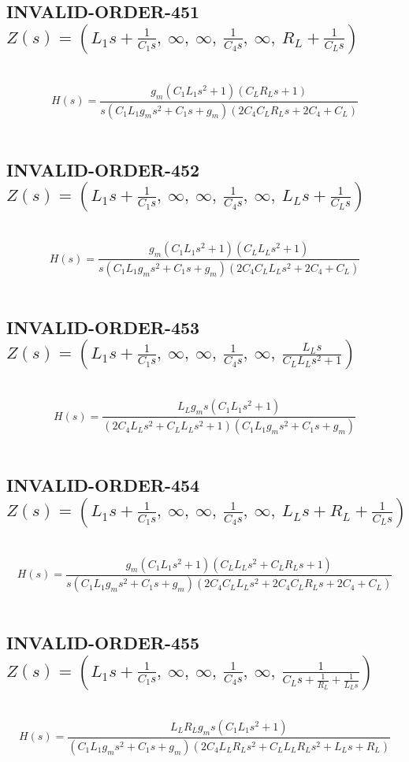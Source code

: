 \documentclass{article}
\begin{document}
\subsection{INVALID-ORDER-451 $Z(s) = \left( L_{1} s + \frac{1}{C_{1} s}, \  \infty, \  \infty, \  \frac{1}{C_{4} s}, \  \infty, \  R_{L} + \frac{1}{C_{L} s}\right)$ } \ 
\textbf{\[H(s) = \frac{g_{m} \left(C_{1} L_{1} s^{2} + 1\right) \left(C_{L} R_{L} s + 1\right)}{s \left(C_{1} L_{1} g_{m} s^{2} + C_{1} s + g_{m}\right) \left(2 C_{4} C_{L} R_{L} s + 2 C_{4} + C_{L}\right)}\] } \ 
\subsection{INVALID-ORDER-452 $Z(s) = \left( L_{1} s + \frac{1}{C_{1} s}, \  \infty, \  \infty, \  \frac{1}{C_{4} s}, \  \infty, \  L_{L} s + \frac{1}{C_{L} s}\right)$ } \ 
\textbf{\[H(s) = \frac{g_{m} \left(C_{1} L_{1} s^{2} + 1\right) \left(C_{L} L_{L} s^{2} + 1\right)}{s \left(C_{1} L_{1} g_{m} s^{2} + C_{1} s + g_{m}\right) \left(2 C_{4} C_{L} L_{L} s^{2} + 2 C_{4} + C_{L}\right)}\] } \ 
\subsection{INVALID-ORDER-453 $Z(s) = \left( L_{1} s + \frac{1}{C_{1} s}, \  \infty, \  \infty, \  \frac{1}{C_{4} s}, \  \infty, \  \frac{L_{L} s}{C_{L} L_{L} s^{2} + 1}\right)$ } \ 
\textbf{\[H(s) = \frac{L_{L} g_{m} s \left(C_{1} L_{1} s^{2} + 1\right)}{\left(2 C_{4} L_{L} s^{2} + C_{L} L_{L} s^{2} + 1\right) \left(C_{1} L_{1} g_{m} s^{2} + C_{1} s + g_{m}\right)}\] } \ 
\subsection{INVALID-ORDER-454 $Z(s) = \left( L_{1} s + \frac{1}{C_{1} s}, \  \infty, \  \infty, \  \frac{1}{C_{4} s}, \  \infty, \  L_{L} s + R_{L} + \frac{1}{C_{L} s}\right)$ } \ 
\textbf{\[H(s) = \frac{g_{m} \left(C_{1} L_{1} s^{2} + 1\right) \left(C_{L} L_{L} s^{2} + C_{L} R_{L} s + 1\right)}{s \left(C_{1} L_{1} g_{m} s^{2} + C_{1} s + g_{m}\right) \left(2 C_{4} C_{L} L_{L} s^{2} + 2 C_{4} C_{L} R_{L} s + 2 C_{4} + C_{L}\right)}\] } \ 
\subsection{INVALID-ORDER-455 $Z(s) = \left( L_{1} s + \frac{1}{C_{1} s}, \  \infty, \  \infty, \  \frac{1}{C_{4} s}, \  \infty, \  \frac{1}{C_{L} s + \frac{1}{R_{L}} + \frac{1}{L_{L} s}}\right)$ } \ 
\textbf{\[H(s) = \frac{L_{L} R_{L} g_{m} s \left(C_{1} L_{1} s^{2} + 1\right)}{\left(C_{1} L_{1} g_{m} s^{2} + C_{1} s + g_{m}\right) \left(2 C_{4} L_{L} R_{L} s^{2} + C_{L} L_{L} R_{L} s^{2} + L_{L} s + R_{L}\right)}\] } \ 
\end{document}
